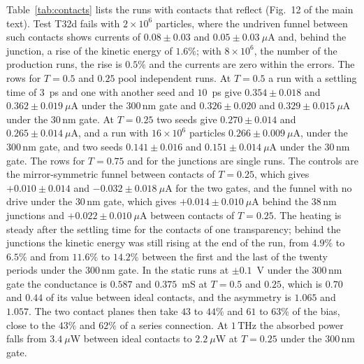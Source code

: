 \documentclass[aps,prapplied,onecolumn,superscriptaddress,floatfix]{revtex4-2}
\newcommand{\nm}{\,\mathrm{nm}}
\newcommand{\THz}{\,\mathrm{THz}}
\begin{document}
Table~\ref{tab:contacts} lists the runs with contacts that reflect
(Fig.~12 of the main text). Test T32d fails with $2\times10^{6}$
particles, where the undriven funnel between such contacts shows
currents of $0.08\pm0.03$ and $0.05\pm0.03\ \mu$A and, behind the
junction, a rise of the kinetic energy of $1.6\%$; with $8\times10^{6}$,
the number of the production runs, the rise is $0.5\%$ and the currents
are zero within the errors. The rows for $T=0.5$ and $0.25$ pool
independent runs. At $T=0.5$ a run with a settling time of $3$~ps and
one with another seed and $10$~ps give $0.354\pm0.018$ and
$0.362\pm0.019\ \mu$A under the $300\nm$ gate and $0.326\pm0.020$ and
$0.329\pm0.015\ \mu$A under the $30\nm$ gate. At $T=0.25$ two seeds give
$0.270\pm0.014$ and $0.265\pm0.014\ \mu$A, and a run with
$16\times10^{6}$ particles $0.266\pm0.009\ \mu$A, under the $300\nm$
gate, and two seeds $0.141\pm0.016$ and $0.151\pm0.014\ \mu$A under the
$30\nm$ gate. The rows for $T=0.75$ and for the junctions are single
runs. The controls are the mirror-symmetric funnel between contacts of
$T=0.25$, which gives $+0.010\pm0.014$ and $-0.032\pm0.018\ \mu$A for
the two gates, and the funnel with no drive under the $30\nm$ gate,
which gives $+0.014\pm0.010\ \mu$A behind the $38\nm$ junctions and
$+0.022\pm0.010\ \mu$A between contacts of $T=0.25$. The heating is
steady after the settling time for the contacts of one transparency;
behind the junctions the kinetic energy was still rising at the end of
the run, from $4.9\%$ to $6.5\%$ and from $11.6\%$ to $14.2\%$ between
the first and the last of the twenty periods under the $300\nm$ gate.
In the static runs at $\pm0.1$~V under the $300\nm$ gate the conductance
is $0.587$ and $0.375$~mS at $T=0.5$ and $0.25$, which is $0.70$ and
$0.44$ of its value between ideal contacts, and the asymmetry is $1.065$
and $1.057$. The two contact planes then take $43$ to $44\%$ and $61$ to
$63\%$ of the bias, close to the $43\%$ and $62\%$ of a series
connection. At $1\THz$ the absorbed power falls from $3.4\ \mu$W between
ideal contacts to $2.2\ \mu$W at $T=0.25$ under the $300\nm$ gate.
\end{document}
